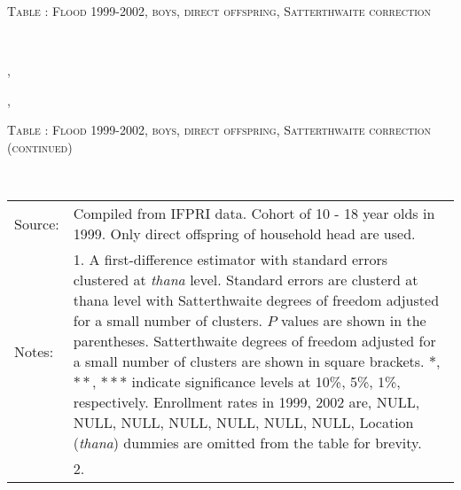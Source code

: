 \begin{table}\hfil\textsc{\footnotesize Table \thetable: Flood 1999-2002, boys, direct offspring, Satterthwaite correction\label{zEm.1999.10.sameN}}\\\setlength{\tabcolsep}{1pt}\renewcommand{\arraystretch}{.675}\hspace{-2em}\hfil{}\\\renewcommand{\arraystretch}{1}\end{table}, \addtocounter{table}{-1}, \begin{table}\hfil\textsc{\footnotesize Table \thetable: Flood 1999-2002, boys, direct offspring, Satterthwaite correction (continued)\label{zEm.1999.10.sameN}}\\\setlength{\tabcolsep}{1pt}\renewcommand{\arraystretch}{.675}\hspace{-2em}\hfil{}\\\renewcommand{\arraystretch}{1}\hfil\begin{tabular}{>{\hfill\scriptsize}p{1cm}<{}>{\scriptsize}p{12cm}<{\hfill}} Source:& Compiled from IFPRI data. Cohort of 10 - 18 year olds in 1999. Only direct offspring of household head are used.\\[-1ex] Notes:& 1. A first-difference estimator with standard errors clustered at \textit{thana} level. Standard errors are clusterd at thana level with Satterthwaite degrees of freedom adjusted for a small number of clusters. $P$ values are shown in the parentheses. Satterthwaite degrees of freedom adjusted for a small number of clusters are shown in square brackets. $*$, $**$, $***$ indicate significance levels at 10\%, 5\%, 1\%, respectively. Enrollment rates in 1999, 2002 are, NULL, NULL, NULL, NULL, NULL, NULL, NULL, Location (\textit{thana}) dummies are omitted from the table for brevity. \\ & 2.   \end{tabular} \end{table}



